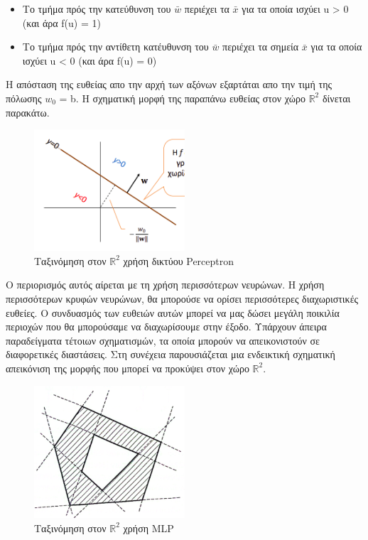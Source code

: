 \documentclass[12pt]{article}
\numberwithin{equation}{section}
\begin{document}
\begin{itemize}
  \item Το τμήμα πρός την κατεύθυνση του \(\bar{w}\) περιέχει τα \(\bar{x}\) για τα οποία ισχύει u > 0 (και άρα f(u) = 1)
  \item Το τμήμα πρός την αντίθετη κατέυθυνση του \(\bar{w}\) περιέχει τα σημεία \(\bar{x}\) για τα οποία ισχύει u < 0 (και άρα f(u) = 0)
\end{itemize} 

Η απόσταση της ευθείας απο την αρχή των αξόνων εξαρτάται απο την τιμή της πόλωσης \(w_0\) = b. Η σχηματική μορφή της παραπάνω ευθείας στον χώρο \(\mathbb{R}^2\) δίνεται παρακάτω.\\

\begin{figure}[h!]
  \centering
  \includegraphics[width=0.5\textwidth]{images/2classclassification.png} %
  \caption{Ταξινόμηση στον \(\mathbb{R}^2\) χρήση δικτύου Perceptron}
  \label{figure 16}
\end{figure}



Ο περιορισμός αυτός αίρεται με τη χρήση περισσότερων νευρώνων. Η χρήση περισσότερων κρυφών νευρώνων, θα μπορούσε να ορίσει περισσότερες διαχωριστικές ευθείες. Ο συνδυασμός των ευθειών αυτών μπορεί να μας δώσει μεγάλη ποικιλία περιοχών που θα μπορούσαμε να διαχωρίσουμε στην έξοδο. Υπάρχουν άπειρα παραδείγματα τέτοιων σχηματισμών, τα οποία μπορούν να απεικονιστούν σε διαφορετικές διαστάσεις. Στη συνέχεια παρουσιάζεται μια ενδεικτική σχηματική απεικόνιση της μορφής που μπορεί να προκύψει στον χώρο \(\mathbb{R}^2\). \\

\begin{figure}[h!]
  \centering
  \includegraphics[width=0.5\textwidth]{images/MLP_class.png} %
  \caption{Ταξινόμηση στον \(\mathbb{R}^2\) χρήση MLP}
  \label{figure 16}
\end{figure}
\end{document}

